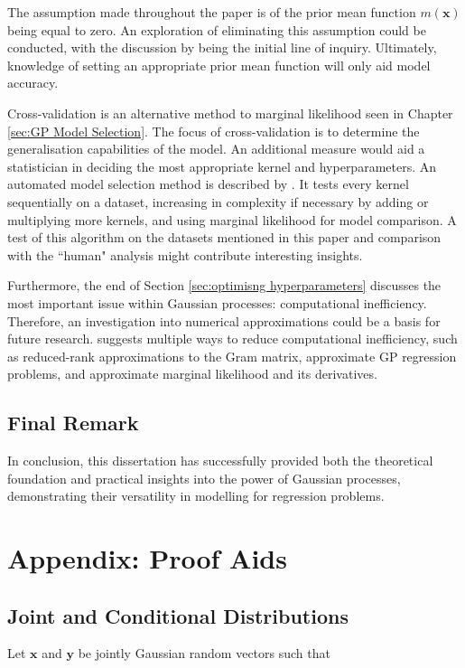 \documentclass[12pt,a4paper]{article}
\begin{document}
The assumption made throughout the paper is of the prior mean function \(m(\mathbf{x})\) being equal to zero. An exploration of eliminating this assumption could be conducted, with the discussion by \citet{williams2006gaussian} being the initial line of inquiry. Ultimately, knowledge of setting an appropriate prior mean function will only aid model accuracy.

Cross-validation is an alternative method to marginal likelihood seen in Chapter \ref{sec:GP Model Selection}. The focus of cross-validation is to determine the generalisation capabilities of the model. An additional measure would aid a statistician in deciding the most appropriate kernel and hyperparameters. An automated model selection method is described by \citet{duvenaud2014automatic}. It tests every kernel sequentially on a dataset, increasing in complexity if necessary by adding or multiplying more kernels, and using marginal likelihood for model comparison. A test of this algorithm on the datasets mentioned in this paper and comparison with the ``human" analysis might contribute interesting insights.  

Furthermore, the end of Section \ref{sec:optimisng hyperparameters} discusses the most important issue within Gaussian processes: computational inefficiency. Therefore, an investigation into numerical approximations could be a basis for future research. \citet{williams2006gaussian} suggests multiple ways to reduce computational inefficiency, such as reduced-rank approximations to the Gram matrix, approximate GP regression problems, and approximate marginal likelihood and its derivatives.


\subsection{Final Remark}

In conclusion, this dissertation has successfully provided both the theoretical foundation and practical insights into the power of Gaussian processes, demonstrating their versatility in modelling for regression problems. 

\newpage
\appendix
\section{Appendix: Proof Aids}
\renewcommand{\theequation}{\Alph{section}.\arabic{equation}}
\setcounter{equation}{0} 
\subsection{Joint and Conditional Distributions}
\label{sec:Joint and Conditional Distributions}
Let \(\mathbf{x}\) and \(\mathbf{y}\) be jointly Gaussian random vectors such that
\end{document}
